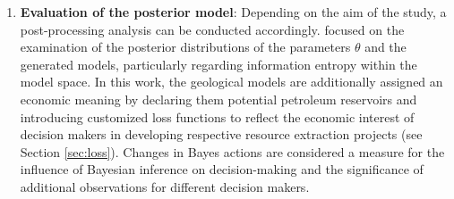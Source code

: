 \begin{enumerate}
        	\item \textbf{Evaluation of the posterior model}: Depending on the aim of the study, a post-processing analysis can be conducted accordingly. \citet{delaVarga2016} focused on the examination of the posterior distributions of the parameters $\theta$ and the generated models, particularly regarding information entropy within the model space. In this work, the geological models are additionally assigned an economic meaning by declaring them potential petroleum reservoirs and introducing customized loss functions to reflect the economic interest of decision makers in developing respective resource extraction projects (see Section \ref{sec:loss}). Changes in Bayes actions are considered a measure for the influence of Bayesian inference on decision-making and the significance of additional observations for different decision makers.
        \end{enumerate}
        
